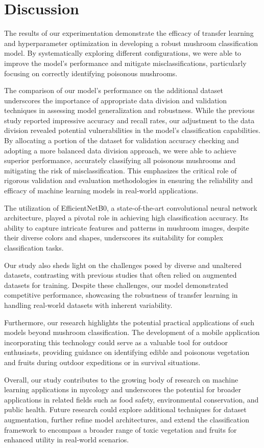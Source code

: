 \section{Discussion}
The results of our experimentation demonstrate the efficacy of transfer learning and hyperparameter optimization in developing a robust mushroom classification model. By systematically exploring different configurations, we were able to improve the model's performance and mitigate misclassifications, particularly focusing on correctly identifying poisonous mushrooms.

The comparison of our model's performance on the additional dataset underscores the importance of appropriate data division and validation techniques in assessing model generalization and robustness. While the previous study reported impressive accuracy and recall rates, our adjustment to the data division revealed potential vulnerabilities in the model's classification capabilities. By allocating a portion of the dataset for validation accuracy checking and adopting a more balanced data division approach, we were able to achieve superior performance, accurately classifying all poisonous mushrooms and mitigating the risk of misclassification. This emphasizes the critical role of rigorous validation and evaluation methodologies in ensuring the reliability and efficacy of machine learning models in real-world applications.


The utilization of EfficientNetB0, a state-of-the-art convolutional neural network architecture, played a pivotal role in achieving high classification accuracy. Its ability to capture intricate features and patterns in mushroom images, despite their diverse colors and shapes, underscores its suitability for complex classification tasks.



Our study also sheds light on the challenges posed by diverse and unaltered datasets, contrasting with previous studies that often relied on augmented datasets for training. Despite these challenges, our model demonstrated competitive performance, showcasing the robustness of transfer learning in handling real-world datasets with inherent variability.


Furthermore, our research highlights the potential practical applications of such models beyond mushroom classification. The development of a mobile application incorporating this technology could serve as a valuable tool for outdoor enthusiasts, providing guidance on identifying edible and poisonous vegetation and fruits during outdoor expeditions or in survival situations.

Overall, our study contributes to the growing body of research on machine learning applications in mycology and underscores the potential for broader applications in related fields such as food safety, environmental conservation, and public health. Future research could explore additional techniques for dataset augmentation, further refine model architectures, and extend the classification framework to encompass a broader range of toxic vegetation and fruits for enhanced utility in real-world scenarios.